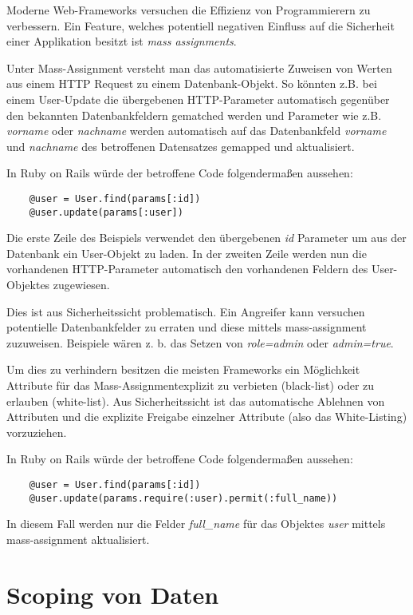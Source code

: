 Moderne Web-Frameworks versuchen die Effizienz von Programmierern zu verbessern. Ein Feature, welches potentiell negativen Einfluss auf die Sicherheit einer Applikation besitzt ist \textit{mass assignments}.

Unter Mass-Assignment versteht man das automatisierte Zuweisen von Werten aus einem HTTP Request zu einem Datenbank-Objekt. So könnten z.B. bei einem User-Update die übergebenen HTTP-Parameter automatisch gegenüber den bekannten Datenbankfeldern gematched werden und Parameter wie z.B. \textit{vorname} oder \textit{nachname} werden automatisch auf das Datenbankfeld \textit{vorname} und \textit{nachname} des betroffenen Datensatzes gemapped und aktualisiert.

In Ruby on Rails würde der betroffene Code folgendermaßen aussehen:

\begin{verbatim}
	@user = User.find(params[:id])
	@user.update(params[:user])
\end{verbatim}

Die erste Zeile des Beispiels verwendet den übergebenen \textit{id} Parameter um aus der Datenbank ein User-Objekt zu laden. In der zweiten Zeile werden nun die vorhandenen HTTP-Parameter automatisch den vorhandenen Feldern des User-Objektes zugewiesen.

Dies ist aus Sicherheitssicht problematisch. Ein Angreifer kann versuchen potentielle Datenbankfelder zu erraten und diese mittels mass-assignment zuzuweisen. Beispiele wären z. b. das Setzen von \textit{role=admin} oder \textit{admin=true}.

Um dies zu verhindern besitzen die meisten Frameworks ein Möglichkeit Attribute für das Mass-Assignmentexplizit zu verbieten (black-list) oder zu erlauben (white-list). Aus Sicherheitssicht ist das automatische Ablehnen von Attributen und die explizite Freigabe einzelner Attribute (also das White-Listing) vorzuziehen.

In Ruby on Rails würde der betroffene Code folgendermaßen aussehen:

\begin{verbatim}
	@user = User.find(params[:id])
	@user.update(params.require(:user).permit(:full_name))
\end{verbatim}

In diesem Fall werden nur die Felder \textit{full\_name} für das Objektes \textit{user} mittels mass-assignment aktualisiert.

\section{Scoping von Daten}

